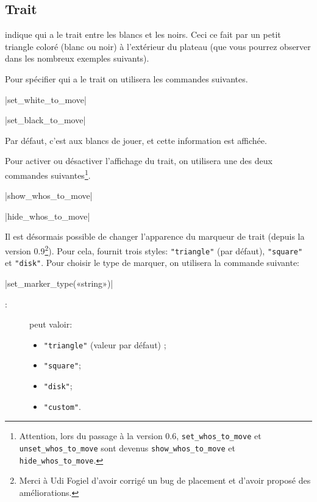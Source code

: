 \documentclass[french]{ltxdoc}
\begin{document}
\subsection{Trait}

\mpchess indique qui a le trait entre les blancs et les noirs. Ceci ce fait par
un petit triangle coloré (blanc ou noir) à l’extérieur du plateau (que vous
pourrez observer dans les nombreux exemples suivants).

Pour spécifier qui a le trait on utilisera les commandes suivantes.

\commande|set_white_to_move|\smallskip


\commande|set_black_to_move|\smallskip

Par défaut, c’est aux blancs de jouer, et cette information est affichée.

Pour activer ou désactiver l’affichage du trait, on utilisera une des deux commandes suivantes\footnote{Attention,
lors du passage à la version 0.6, \lstinline+set_whos_to_move+ et
\lstinline+unset_whos_to_move+ sont devenus \lstinline+show_whos_to_move+ et
\lstinline+hide_whos_to_move+.}.

\commande|show_whos_to_move|\smallskip


\commande|hide_whos_to_move|\smallskip

Il est désormais possible de changer l’apparence du marqueur de trait (depuis la
version 0.9\footnote{Merci à Udi Fogiel d’avoir corrigé un bug de placement et
d’avoir proposé des améliorations.}). Pour cela, \mpchess fournit trois styles:
\lstinline+"triangle"+ (par défaut), \lstinline+"square"+ et \lstinline+"disk"+.
Pour choisir le type de marquer, on utilisera la commande suivante:


\commande|set_marker_type(«string»)|\smallskip

\begin{description}
  \item[:] peut valoir:
\begin{itemize}
  \item \lstinline+"triangle"+ (valeur par défaut) ;
  \item \lstinline+"square"+;
\item \lstinline+"disk"+;
\item \lstinline+"custom"+.
\end{itemize}
\end{description}
\end{document}
